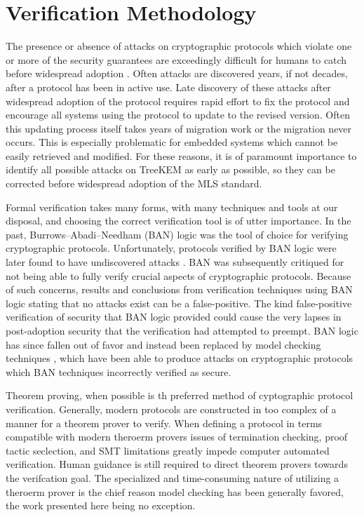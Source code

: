 \hypertarget{sec:methodology}{%
\chapter{Verification Methodology}\label{sec:methodology}}

The presence or absence of attacks on cryptographic protocols which violate one or more of the security guarantees are exceedingly difficult for humans to catch before widespread adoption \autocite{clark1997survey}.
Often attacks are discovered years, if not decades, after a protocol has been in active use.
Late discovery of these attacks after widespread adoption of the protocol requires rapid effort to fix the protocol and encourage all systems using the protocol to update to the revised version.
Often this updating process itself takes years of migration work or the migration never occurs.
This is especially problematic for embedded systems which cannot be easily retrieved and modified.
For these reasons, it is of paramount importance to identify all possible attacks on TreeKEM as early as possible, so they can be corrected before widespread adoption of the MLS standard.

Formal verification takes many forms, with many techniques and tools at our disposal, and choosing the correct verification tool is of utter importance.
In the past, Burrows--Abadi--Needham (BAN) \autocite{burrows1989logic} logic was the tool of choice for verifying cryptographic protocols.
Unfortunately, protocols verified by BAN logic were later found to have undiscovered attacks \autocite{10.5555/188307.188350}.
BAN was subsequently critiqued for not being able to fully verify crucial aspects of cryptographic protocols.
Because of such concerns, results and conclusions from verification techniques using BAN logic stating that no attacks exist can be a false-positive.
The kind false-positive verification of security that BAN logic provided could cause the very lapses in post-adoption security that the verification had attempted to preempt.
BAN logic has since fallen out of favor and instead been replaced by model checking techniques \autocite{marrero1997model}, which have been able to produce attacks on cryptographic protocols which BAN techniques incorrectly verified as secure.

Theorem proving, when possible is th preferred method of cyptographic protocol verification.
Generally, modern protocols are constructed in too complex of a manner for a theorem prover to verify.
When defining a protocol in terms compatible with modern theroerm provers issues of termination checking, proof tactic seclection, and SMT limitations greatly impede computer automated verification.
Human guidance is still required to direct theorem provers towards the verifcation goal.
The specialized and time-consuming nature of utilizing a theroerm prover is the chief reason model checking has been generally favored, the work presented here being no exception.

